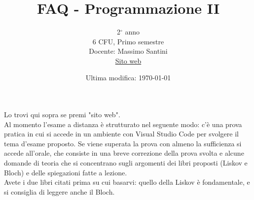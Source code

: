 \documentclass{article}
\title{FAQ - \textbf{Programmazione II}}
\date{Ultima modifica: \today}
\author{
	2$^{\circ}$ anno\\6 CFU, Primo semestre\\
	Docente: Massimo Santini\\ 
	\href{https://prog2.di.unimi.it/}{Sito web}
}
\begin{document}
 
	\maketitle
	
	\begin{enumerate}
		
		\rmfamily
		Lo trovi qui sopra se premi "sito web".\\
		
		Al momento l'esame a distanza è strutturato nel seguente modo: c'è una prova pratica in cui si accede
		in un ambiente con Visual Studio Code per svolgere il tema d'esame proposto. Se viene superata la prova
		con almeno la sufficienza si accede all'orale, che consiste in una breve correzione della prova svolta
		e alcune domande di teoria che si concentrano sugli argomenti dei libri proposti (Liskov e Bloch) e delle
		spiegazioni fatte a lezione.\\
		
		
		Avete i due libri citati prima su cui basarvi: quello della Liskov è fondamentale, e si consiglia
		di leggere anche il Bloch.\\
		
	\end{enumerate}
	
\end{document}
